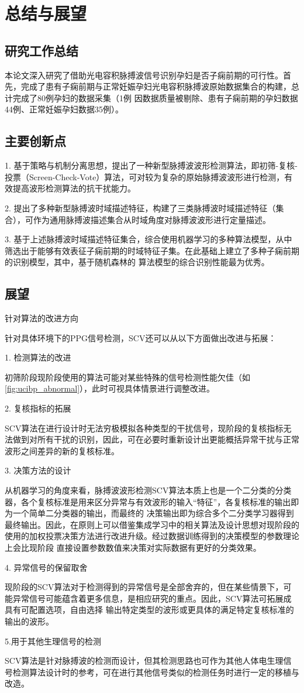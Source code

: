 \chapter{总结与展望}
\section{研究工作总结}
本论文深入研究了借助光电容积脉搏波信号识别孕妇是否子痫前期的可行性。首先，完成了患有子痫前期与正常妊娠孕妇光电容积脉搏波原始数据集合的构建，总计完成了80例孕妇的数据采集（1例
因数据质量被剔除、患有子痫前期的孕妇数据44例、正常妊娠孕妇数据35例）。

\section{主要创新点}
1. 基于策略与机制分离思想，提出了一种新型脉搏波波形检测算法，即初筛-复核-投票（Screen-Check-Vote）算法，可对较为复杂的原始脉搏波波形进行检测，有效提高波形检测算法的抗干扰能力。

2. 提出了多种新型脉搏波时域描述特征，构建了三类脉搏波时域描述特征（集合），可作为通用脉搏波描述集合从时域角度对脉搏波波形进行定量描述。

3. 基于上述脉搏波时域描述特征集合，综合使用机器学习的多种算法模型，从中筛选出于能够有效表征子痫前期的时域特征子集。在此基础上建立了多种子痫前期的识别模型，其中，基于随机森林的
算法模型的综合识别性能最为优秀。

\section{展望}

针对算法的改进方向

针对具体环境下的PPG信号检测，SCV还可以从以下方面做出改进与拓展：

1. 检测算法的改进

初筛阶段现阶段使用的算法可能对某些特殊的信号检测性能欠佳（如\autoref{fig:ucibp_abnormal}），此时可视具体情景进行调整改进。

2. 复核指标的拓展

SCV算法在进行设计时无法穷极模拟各种类型的干扰信号，现阶段的复核指标无法做到对所有干扰的识别，因此，可在必要时重新设计出更能概括异常干扰与正常波形之间差异的新的复核标准。

3. 决策方法的设计

从机器学习的角度来看，脉搏波波形检测SCV算法本质上也是一个二分类的分类器，各个复核标准是用来区分异常与有效波形的输入“特征”，各复核标准的输出即为一个简单二分类器的输出，而最终的
决策输出即为综合多个二分类学习器得到最终输出。因此，在原则上可以借鉴集成学习中的相关算法及设计思想对现阶段的使用的加权投票决策方法进行改进升级。经过数据训练得到的决策模型的参数理论上会比现阶段
直接设置参数数值来决策对实际数据有更好的分类效果。

4. 异常信号的保留取舍

现阶段的SCV算法对于检测得到的异常信号是全部舍弃的，但在某些情景下，可能异常信号可能蕴含着更多信息，是相应研究的重点。因此，SCV算法可拓展成具有可配置选项，自由选择
输出特定类型的波形或更具体的满足特定复核标准的输出的波形。

5.用于其他生理信号的检测

SCV算法是针对脉搏波的检测而设计，但其检测思路也可作为其他人体电生理信号检测算法设计时的参考，可在进行其他信号类似的检测任务时进行一定的移植与改造。
